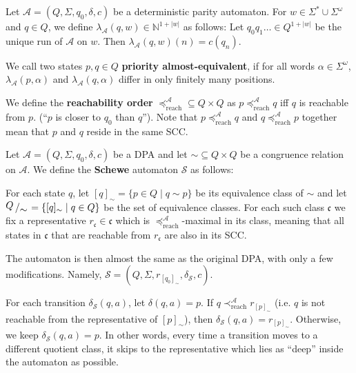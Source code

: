 



\begin{defn}
	Let $\mathcal{A} = (Q, \Sigma, q_0, \delta, c)$ be a deterministic parity automaton. For $w \in \Sigma^* \cup \Sigma^\omega$ and $q \in Q$, we define $\lambda_\mathcal{A}(q, w) \in \mathbb{N}^{1+|w|}$ as follows: Let $q_0 q_1 \dots \in Q^{1+|w|}$ be the unique run of $\mathcal{A}$ on $w$. Then $\lambda_\mathcal{A}(q, w)(n) = c(q_n)$.
	
	We call two states $p, q \in Q$ \textbf{priority almost-equivalent}, if for all words $\alpha \in \Sigma^\omega$, $\lambda_\mathcal{A}(p, \alpha)$ and $\lambda_\mathcal{A}(q, \alpha)$ differ in only finitely many positions.
	
	We define the \textbf{reachability order} $\preceq_\text{reach}^\mathcal{A} \subseteq Q \times Q$ as $p \preceq_\text{reach}^\mathcal{A} q$ iff $q$ is reachable from $p$. (\enquote{$p$ is closer to $q_0$ than $q$}). Note that $p \preceq_\text{reach}^\mathcal{A} q$ and $q \preceq_\text{reach}^\mathcal{A} p$ together mean that $p$ and $q$ reside in the same SCC.
\end{defn}

\begin{defn}
	Let $\mathcal{A} = (Q, \Sigma, q_0, \delta, c)$ be a DPA and let $\sim \subseteq Q \times Q$ be a congruence relation on $\mathcal{A}$. We define the \textbf{Schewe} automaton $\mathcal{S}$ as follows:
	
	For each state $q$, let $[q]_\sim = \{ p \in Q \mid q \sim p \}$ be its equivalence class of $\sim$ and let $\bigslant{Q}{\sim} = \{[q]_\sim \mid q \in Q\}$ be the set of equivalence classes. For each such class $\mathfrak{c}$ we fix a representative $r_\mathfrak{c} \in \mathfrak{c}$ which is $\preceq_\text{reach}^\mathcal{A}$-maximal in its class, meaning that all states in $\mathfrak{c}$ that are reachable from $r_\mathfrak{c}$ are also in its SCC. 
	
	The automaton is then almost the same as the original DPA, with only a few modifications. Namely, $\mathcal{S} = (Q, \Sigma, r_{[q_0]_\sim}, \delta_\mathcal{S}, c)$.
	
	For each transition $\delta_\mathcal{S}(q, a)$, let $\delta(q, a) = p$. If $q \prec_\text{reach}^\mathcal{A} r_{[p]_\sim}$ (i.e. $q$ is not reachable from the representative of $[p]_\sim$), then $\delta_\mathcal{S}(q, a) = r_{[p]_\sim}$. Otherwise, we keep $\delta_\mathcal{S}(q, a) = p$. In other words, every time a transition moves to a different quotient class, it skips to the representative which lies as \enquote{deep} inside the automaton as possible.
\end{defn}

